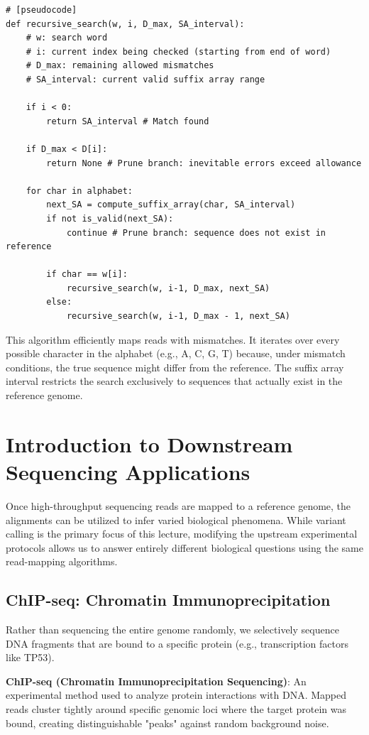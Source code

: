 \documentclass[11pt,a4paper]{article}
\newenvironment{important}{
    \vspace{1em}
    \begin{tcolorbox}[colback=blue!5!white, colframe=blue!75!black, boxrule=1pt, arc=4pt, left=10pt, right=10pt, top=10pt, bottom=10pt]
}{
    \end{tcolorbox}
    \vspace{1em}
}
\begin{document}
\begin{verbatim}
# [pseudocode]
def recursive_search(w, i, D_max, SA_interval):
    # w: search word
    # i: current index being checked (starting from end of word)
    # D_max: remaining allowed mismatches
    # SA_interval: current valid suffix array range
    
    if i < 0:
        return SA_interval # Match found
        
    if D_max < D[i]:
        return None # Prune branch: inevitable errors exceed allowance
        
    for char in alphabet:
        next_SA = compute_suffix_array(char, SA_interval)
        if not is_valid(next_SA):
            continue # Prune branch: sequence does not exist in reference
            
        if char == w[i]:
            recursive_search(w, i-1, D_max, next_SA)
        else:
            recursive_search(w, i-1, D_max - 1, next_SA)
\end{verbatim}

This algorithm efficiently maps reads with mismatches. It iterates over every possible character in the alphabet (e.g., A, C, G, T) because, under mismatch conditions, the true sequence might differ from the reference. The suffix array interval restricts the search exclusively to sequences that actually exist in the reference genome.

\section{Introduction to Downstream Sequencing Applications}
Once high-throughput sequencing reads are mapped to a reference genome, the alignments can be utilized to infer varied biological phenomena. While variant calling is the primary focus of this lecture, modifying the upstream experimental protocols allows us to answer entirely different biological questions using the same read-mapping algorithms.

\subsection{ChIP-seq: Chromatin Immunoprecipitation}
Rather than sequencing the entire genome randomly, we selectively sequence DNA fragments that are bound to a specific protein (e.g., transcription factors like TP53). 

\begin{important}
  \textbf{ChIP-seq (Chromatin Immunoprecipitation Sequencing)}: An experimental method used to analyze protein interactions with DNA. Mapped reads cluster tightly around specific genomic loci where the target protein was bound, creating distinguishable "peaks" against random background noise.
\end{important}
\end{document}
